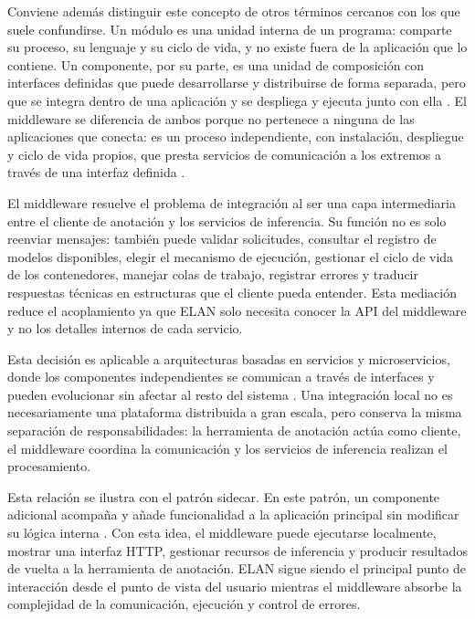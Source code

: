 Conviene además distinguir este concepto de otros términos cercanos con los que suele confundirse. Un módulo es una unidad interna de un programa: comparte su proceso, su lenguaje y su ciclo de vida, y no existe fuera de la aplicación que lo contiene. Un componente, por su parte, es una unidad de composición con interfaces definidas que puede desarrollarse y distribuirse de forma separada, pero que se integra dentro de una aplicación y se despliega y ejecuta junto con ella \cite{szyperski2002component}. El middleware se diferencia de ambos porque no pertenece a ninguna de las aplicaciones que conecta: es un proceso independiente, con instalación, despliegue y ciclo de vida propios, que presta servicios de comunicación a los extremos a través de una interfaz definida \cite{bernstein1996middleware}.

El middleware resuelve el problema de integración al ser una capa intermediaria entre el cliente de anotación y los servicios de inferencia. Su función no es solo reenviar mensajes: también puede validar solicitudes, consultar el registro de modelos disponibles, elegir el mecanismo de ejecución, gestionar el ciclo de vida de los contenedores, manejar colas de trabajo, registrar errores y traducir respuestas técnicas en estructuras que el cliente pueda entender. Esta mediación reduce el acoplamiento ya que ELAN solo necesita conocer la API del middleware y no los detalles internos de cada servicio.

Esta decisión es aplicable a arquitecturas basadas en servicios y microservicios, donde los componentes independientes se comunican a través de interfaces y pueden evolucionar sin afectar al resto del sistema \cite{dragoni2017microservices}. Una integración local no es necesariamente una plataforma distribuida a gran escala, pero conserva la misma separación de responsabilidades: la herramienta de anotación actúa como cliente, el middleware coordina la comunicación y los servicios de inferencia realizan el procesamiento.

Esta relación se ilustra con el patrón sidecar. En este patrón, un componente adicional acompaña y añade funcionalidad a la aplicación principal sin modificar su lógica interna \cite{burns2016container_patterns}. Con esta idea, el middleware puede ejecutarse localmente, mostrar una interfaz HTTP, gestionar recursos de inferencia y producir resultados de vuelta a la herramienta de anotación. ELAN sigue siendo el principal punto de interacción desde el punto de vista del usuario mientras el middleware absorbe la complejidad de la comunicación, ejecución y control de errores.

